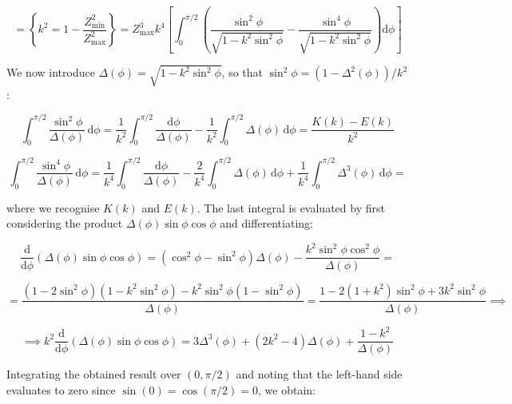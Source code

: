 \begin{enumerate}
    \begin{equation}
        =\left\{k^2={1-\frac{Z_\text{min}^2}{Z_\text{max}^2}}\right\}=Z_\text{max}^3k^4\left[\int_0^{\pi/2}\left(\frac{\sin^2{\phi}}{\sqrt{1-k^2\sin^2{\phi}}}-\frac{\sin^4{\phi}}{\sqrt{1-k^2\sin^2{\phi}}}\right)\text{d}\phi\right]
    \end{equation}

    We now introduce $\Delta(\phi)=\sqrt{1-k^2\sin^2{\phi}}$, so that $\sin^2{\phi}=(1-\Delta^2(\phi))/k^2$:

    \begin{equation}
        \int_0^{\pi/2}\frac{\sin^2{\phi}}{\Delta(\phi)}\,\text{d}\phi=\frac{1}{k^2}\int_0^{\pi/2}\frac{\mathrm{d}\phi}{\Delta(\phi)}-\frac{1}{k^2}\int_0^{\pi/2}\Delta(\phi)\,\mathrm{d}\phi=\frac{K(k)-E(k)}{k^2}
    \end{equation}

    \begin{equation*}
        \int_0^{\pi/2}\frac{\sin^4{\phi}}{\Delta(\phi)}\,\mathrm{d}\phi=\frac{1}{k^4}\int_0^{\pi/2}\frac{\mathrm{d}\phi}{\Delta(\phi)}-\frac{2}{k^4}\int_0^{\pi/2}\Delta(\phi)\,\mathrm{d}\phi+\frac{1}{k^4}\int_0^{\pi/2}\Delta^3(\phi)\,\mathrm{d}\phi=
    \end{equation*}

    where we recognise $K(k)$ and $E(k)$. The last integral is evaluated by first considering the product $\Delta(\phi)\sin{\phi}\cos{\phi}$ and differentiating:

    \begin{equation*}
        \frac{\mathrm{d}}{\mathrm{d}\phi}\left(\Delta(\phi)\sin{\phi}\cos{\phi}\right)=(\cos^2{\phi}-\sin^2{\phi})\Delta(\phi)-\frac{k^2\sin^2{\phi}\cos^2{\phi}}{\Delta(\phi)}=
    \end{equation*}

    \begin{equation*}
        =\frac{(1-2\sin^2{\phi})(1-k^2\sin^2{\phi})-k^2\sin^2{\phi}(1-\sin^2{\phi})}{\Delta(\phi)}=\frac{1-2(1+k^2)\sin^2{\phi}+3k^2\sin^2{\phi}}{\Delta(\phi)}\implies
    \end{equation*}

    \begin{equation}
        \implies k^2\frac{\mathrm{d}}{\mathrm{d}\phi}\left(\Delta(\phi)\sin{\phi}\cos{\phi}\right)=3\Delta^3(\phi)+(2k^2-4)\Delta(\phi)+\frac{1-k^2}{\Delta(\phi)}
    \end{equation}

    Integrating the obtained result over $(0,\pi/2)$ and noting that the left-hand side evaluates to zero since $\sin{(0)}=\cos{(\pi/2)}=0$, we obtain:


\end{enumerate}

